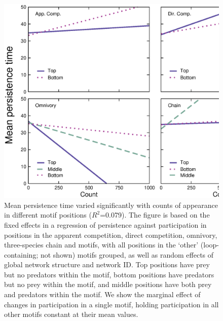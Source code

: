 \documentclass[12pt]{article}
\begin{document}
\begin{spacing}{2.0}
        \begin{figure}[ht!]
            \centering
            \includegraphics[width=\textwidth]{figures/roles/persistence_vs_positions_count.eps}
            \caption{Mean persistence time varied significantly with counts of appearance in different motif positions ($R^2$=0.079). The figure is based on the fixed effects in a regression of persistence against participation in positions in the apparent competition, direct competition, omnivory, three-species chain and motifs, with all positions in the `other' (loop-containing; not shown) motifs grouped, as well as random effects of global network structure and network ID. Top positions have prey but no predators within the motif, bottom positions have predators but no prey within the motif, and middle positions have both prey and predators within the motif. We show the marginal effect of changes in participation in a single motif, holding participation in all other motifs constant at their mean values.}
            \label{fig:persistence_positions_count}
        \end{figure}



\end{spacing}
\end{document}
